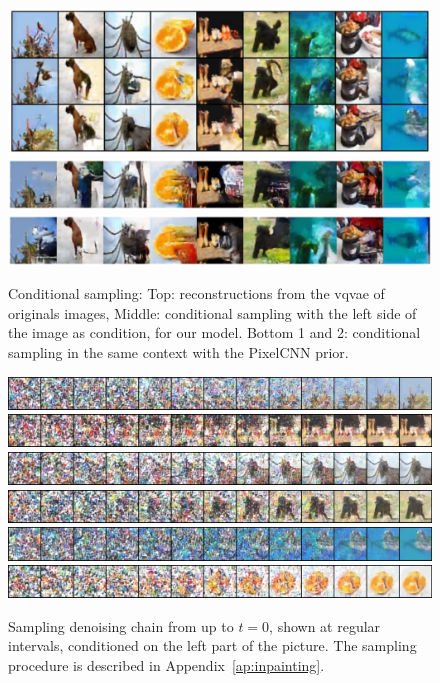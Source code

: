 \documentclass{article}
\theoremstyle{plain}
\theoremstyle{definition}
\theoremstyle{remark}
\begin{document}
\begin{figure}
    \centering
    \includegraphics[width=.8\linewidth]{./cond_sampling2.pdf}
    \includegraphics[width=.8\linewidth]{./cond_sampling_pixelcnn_train.pdf}
    \includegraphics[width=.8\linewidth]{./cond_sampling_pixelcnn_train2.pdf}
    \caption{Conditional sampling: Top: reconstructions from the vqvae of originals images, Middle: conditional sampling with the left side of the image as condition, for our model. Bottom 1 and 2: conditional sampling in the same context with the PixelCNN prior.}
    \label{fig:miniimagenet_prior_ours_conditional2}
\end{figure}


\begin{figure}
    \centering
    \includegraphics[width=.8\linewidth]{./media_images_conditional_sampling_chain_14_4.pdf}
    \includegraphics[width=.8\linewidth]{./media_images_conditional_sampling_chain_14_0.pdf}
    \includegraphics[width=.8\linewidth]{./media_images_conditional_sampling_chain_13_4.pdf}
    \includegraphics[width=.8\linewidth]{./media_images_conditional_sampling_chain_14_1.pdf}
    \includegraphics[width=.8\linewidth]{./media_images_conditional_sampling_chain_12_1.pdf}
    \includegraphics[width=.8\linewidth]{./media_images_conditional_sampling_chain_10_4.pdf}
    \caption{Sampling denoising chain from up to $t=0$, shown at regular intervals, conditioned on the left part of the picture. The sampling procedure is described in Appendix~\ref{ap:inpainting}.}
    \label{fig:miniimagenet_prior_ours_chain2}
\end{figure}
\end{document}

